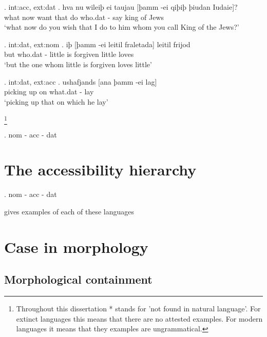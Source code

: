 \ex. \ac{int}:\ac{acc}, \ac{ext}:\ac{dat}
\ag. hva nu wileiþ ei taujau [þamm -ei qiþiþ þiudan Iudaie]?\\
 what now want that do\scsub{[dat]} who.\ac{dat} - say\scsub{[acc]} king {of Jews}\\
 `what now do you wish that I do to him whom you call King of the Jews?' 

\ex. \ac{int}:\ac{dat}, \ac{ext}:\ac{nom}
\ag. iþ [þamm -ei leitil fraletada] leitil frijod\\
 but who.\ac{dat} - little {is forgiven\scsub{[dat]}} little loves\scsub{[nom]}\\
 `but the one whom little is forgiven loves little' 

\ex. \ac{int}:\ac{dat}, \ac{ext}:\ac{acc}
\ag. ushafjands [ana þamm -ei lag]\\
 {picking up}\scsub{[acc]} on\scsub{[dat]} what.\ac{dat} - lay\\
 `picking up that on which he lay' 


\footnote{Throughout this dissertation * stands for 'not found in natural language'. For extinct languages this means that there are no attested examples. For modern languages it means that they examples are ungrammatical.}



\ex. \ac{nom} - \ac{acc} - \ac{dat}

\phantom{nom}



\section{The accessibility hierarchy}

\ex. \ac{nom} - \ac{acc} - \ac{dat}

gives examples of each of these languages




\section{Case in morphology}

\subsection{Morphological containment}

